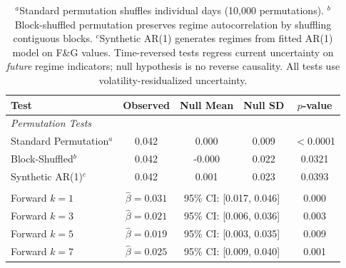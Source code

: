 \begin{table}[h!]
\centering
\caption{Placebo and Identification Tests}
\label{tab:placebo}
\small
\begin{tabular}{@{}lcccc@{}}
\toprule
\textbf{Test} & \textbf{Observed} & \textbf{Null Mean} & \textbf{Null SD} & \textbf{$p$-value} \\
\midrule
\multicolumn{5}{l}{\textit{Permutation Tests}} \\
Standard Permutation$^a$ & 0.042 & 0.000 & 0.009 & $<$0.0001 \\
Block-Shuffled$^b$ & 0.042 & -0.000 & 0.022 & 0.0321 \\
Synthetic AR(1)$^c$ & 0.042 & 0.001 & 0.023 & 0.0393 \\
\addlinespace
\multicolumn{5}{l}{\textit{Time-Reversed Causality (spread$_t$ $\sim$ regime$_{t+k}$)}} \\
Forward $k=1$ & $\hat{\beta}=0.031$ & \multicolumn{2}{c}{95\% CI: [0.017, 0.046]} & 0.000 \\
Forward $k=3$ & $\hat{\beta}=0.021$ & \multicolumn{2}{c}{95\% CI: [0.006, 0.036]} & 0.003 \\
Forward $k=5$ & $\hat{\beta}=0.019$ & \multicolumn{2}{c}{95\% CI: [0.003, 0.035]} & 0.009 \\
Forward $k=7$ & $\hat{\beta}=0.025$ & \multicolumn{2}{c}{95\% CI: [0.009, 0.040]} & 0.001 \\
\bottomrule
\end{tabular}
\vspace{0.3em}
\caption*{\footnotesize
$^a$Standard permutation shuffles individual days (10,000 permutations).
$^b$Block-shuffled permutation preserves regime autocorrelation by shuffling contiguous blocks.
$^c$Synthetic AR(1) generates regimes from fitted AR(1) model on F\&G values.
Time-reversed tests regress current uncertainty on \textit{future} regime indicators; null hypothesis is no reverse causality.
All tests use volatility-residualized uncertainty.}
\end{table}
